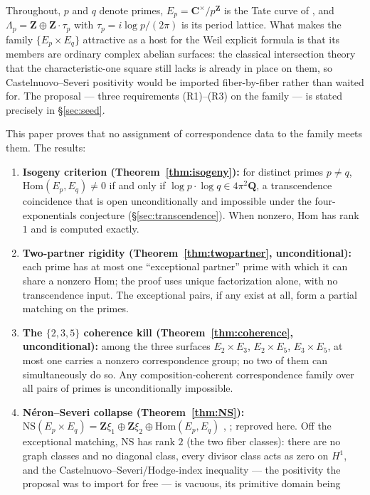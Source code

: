 \documentclass[11pt]{article}
\theoremstyle{definition}
\theoremstyle{remark}
\newcommand{\Z}{\mathbf{Z}}
\newcommand{\Q}{\mathbf{Q}}
\newcommand{\C}{\mathbf{C}}
\newcommand{\NS}{\mathrm{NS}}
\newcommand{\Hom}{\mathrm{Hom}}
\begin{document}
Throughout, $p$ and $q$ denote primes, $E_p = \C^\times/p^{\Z}$ is the Tate
curve of \cite{CC26}, and $\Lambda_p = \Z \oplus \Z\cdot\tau_p$ with
$\tau_p = i\log p/(2\pi)$ is its period lattice. What makes the family
$\{E_p \times E_q\}$ attractive as a host for the Weil explicit formula is
that its members are ordinary complex abelian surfaces: the classical
intersection theory that the characteristic-one square still lacks is already
in place on them, so Castelnuovo--Severi positivity would be imported
fiber-by-fiber rather than waited for. The proposal --- three requirements
(R1)--(R3) on the family --- is stated precisely in \S\ref{sec:seed}.

This paper proves that no assignment of correspondence data to the family
meets them. The results:

\begin{enumerate}
\item \textbf{Isogeny criterion (Theorem~\ref{thm:isogeny}):} for
distinct primes $p \neq q$, $\Hom(E_p, E_q) \neq 0$ if and only if
$\log p \cdot \log q \in 4\pi^2\Q$, a transcendence coincidence that is open
unconditionally and impossible under the four-exponentials conjecture
(\S\ref{sec:transcendence}). When nonzero, $\Hom$ has rank $1$ and is
computed exactly.
\item \textbf{Two-partner rigidity (Theorem~\ref{thm:twopartner},
unconditional):} each prime has at most one ``exceptional partner''
prime with which it can share a nonzero $\Hom$; the proof uses unique
factorization alone, with no transcendence input. The exceptional pairs, if
any exist at all, form a partial matching on the primes.
\item \textbf{The $\{2,3,5\}$ coherence kill (Theorem~\ref{thm:coherence},
unconditional):} among the three surfaces $E_2\times E_3$, $E_2\times E_5$,
$E_3\times E_5$, at most one carries a nonzero correspondence group; no two
of them can simultaneously do so. Any composition-coherent correspondence
family over all pairs of primes is unconditionally impossible.
\item \textbf{N\'eron--Severi collapse (Theorem~\ref{thm:NS}):}
$\NS(E_p \times E_q) = \Z\xi_1 \oplus \Z\xi_2 \oplus \Hom(E_p, E_q)$
\cite[Ch.~5]{BL}, \cite[Prop.~2.3]{RS14}; reproved here. Off the exceptional
matching, $\NS$ has rank $2$ (the two fiber classes): there are no graph
classes and no diagonal class, every divisor class acts as zero on $H^1$, and
the Castelnuovo--Severi/Hodge-index inequality --- the positivity the
proposal was to import for free --- is vacuous, its primitive domain being

\end{enumerate}
\end{document}
